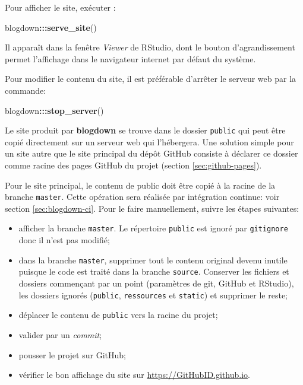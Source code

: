\documentclass[
  12pt,
  french,
  a4paper,
  extrafontsizes,onecolumn,openright
  ]{memoir}
\newenvironment{Shaded}{\begin{snugshade}}{\end{snugshade}}
\newcommand{\KeywordTok}[1]{\textcolor[rgb]{0.13,0.29,0.53}{\textbf{#1}}}
\newcommand{\NormalTok}[1]{#1}
\newcommand{\OperatorTok}[1]{\textcolor[rgb]{0.81,0.36,0.00}{\textbf{#1}}}
\providecommand{\tightlist}{%
  \setlength{\itemsep}{0pt}\setlength{\parskip}{0pt}}
\begin{document}
Pour afficher le site, exécuter :

\scriptsize

\begin{Shaded}
\begin{Highlighting}[]
\NormalTok{blogdown}\OperatorTok{:::}\KeywordTok{serve_site}\NormalTok{()}
\end{Highlighting}
\end{Shaded}

\normalsize

Il apparaît dans la fenêtre \emph{Viewer} de RStudio, dont le bouton d'agrandissement permet l'affichage dans le navigateur internet par défaut du système.

Pour modifier le contenu du site, il est préférable d'arrêter le serveur web par la commande:

\scriptsize

\begin{Shaded}
\begin{Highlighting}[]
\NormalTok{blogdown}\OperatorTok{:::}\KeywordTok{stop_server}\NormalTok{()}
\end{Highlighting}
\end{Shaded}

\normalsize

Le site produit par \textbf{blogdown} se trouve dans le dossier \texttt{public} qui peut être copié directement sur un serveur web qui l'hébergera.
Une solution simple pour un site autre que le site principal du dépôt GitHub consiste à déclarer ce dossier comme racine des pages GitHub du projet
(section \ref{sec:github-pages}).

Pour le site principal, le contenu de public doit être copié à la racine de la branche \texttt{master}.
Cette opération sera réalisée par intégration continue: voir section \ref{sec:blogdown-ci}.
Pour le faire manuellement, suivre les étapes suivantes:

\begin{itemize}
\tightlist
\item
  afficher la branche \texttt{master}. Le répertoire \texttt{public} est ignoré par \texttt{gitignore} donc il n'est pas modifié;
\item
  dans la branche \texttt{master}, supprimer tout le contenu original devenu inutile puisque le code est traité dans la branche \texttt{source}. Conserver les fichiers et dossiers commençant par un point (paramètres de git, GitHub et RStudio), les dossiers ignorés (\texttt{public}, \texttt{ressources} et \texttt{static}) et supprimer le reste;
\item
  déplacer le contenu de \texttt{public} vers la racine du projet;
\item
  valider par un \emph{commit};
\item
  pousser le projet sur GitHub;
\item
  vérifier le bon affichage du site sur \url{https://GitHubID.github.io}.
\end{itemize}
\end{document}
